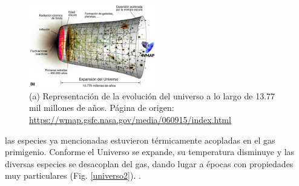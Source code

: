 \begin{figure}
\centering
\includegraphics[width=0.49\textwidth]{Fisica_de_Particulas/imagenes/Universo_evo0.jpg}
\caption{(a) Representación de la evolución del universo a lo largo de 13.77 mil millones de a\~nos. Página de origen: \url{https://wmap.gsfc.nasa.gov/media/060915/index.html}}
\label{universo}
\end{figure}
las especies ya mencionadas estuvieron térmicamente acopladas en el gas primigenio. Conforme el Universo se expande, su temperatura disminuye y las diversas especies se desacoplan del gas, dando lugar a épocas con propiedades muy particulares (Fig. \ref{universo2}).%
.
